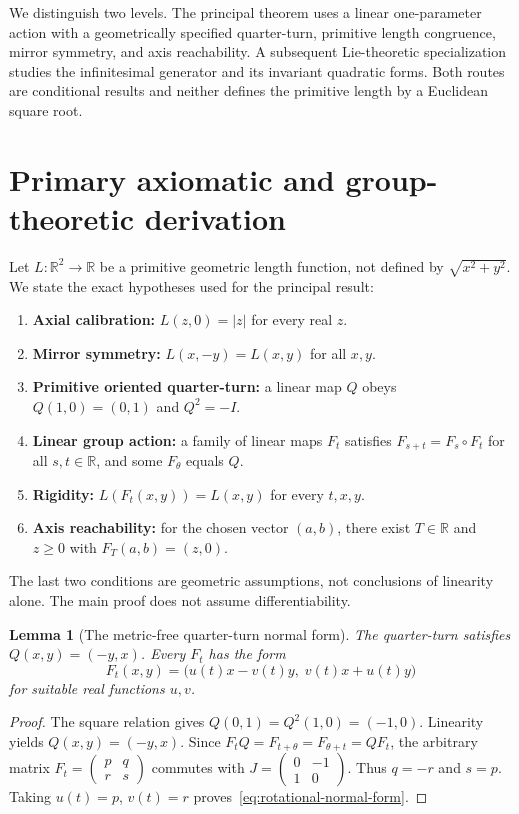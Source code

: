 \documentclass[11pt,a4paper]{article}
\newtheorem{lemma}{Lemma}[section]
\begin{document}
We distinguish two levels. The principal theorem uses a linear one-parameter action with a geometrically specified quarter-turn, primitive length congruence, mirror symmetry, and axis reachability. A subsequent Lie-theoretic specialization studies the infinitesimal generator and its invariant quadratic forms. Both routes are conditional results and neither defines the primitive length by a Euclidean square root.


\section{Primary axiomatic and group-theoretic derivation}
\label{sec:primary}
Let $L:\mathbb R^2\to\mathbb R$ be a primitive geometric length function,
not defined by $\sqrt{x^2+y^2}$. We state the exact hypotheses used
for the principal result:
\begin{enumerate}
\item \textbf{Axial calibration:} $L(z,0)=|z|$ for every real $z$.
\item \textbf{Mirror symmetry:} $L(x,-y)=L(x,y)$ for all $x,y$.
\item \textbf{Primitive oriented quarter-turn:} a linear map $Q$ obeys
$Q(1,0)=(0,1)$ and $Q^2=-I$.
\item \textbf{Linear group action:} a family of linear maps
$F_t$ satisfies $F_{s+t}=F_s\circ F_t$ for all $s,t\in\mathbb R$,
and some $F_\theta$ equals $Q$.
\item \textbf{Rigidity:} $L(F_t(x,y))=L(x,y)$ for every $t,x,y$.
\item \textbf{Axis reachability:} for the chosen vector $(a,b)$,
there exist $T\in\mathbb R$ and $z\geq0$ with
$F_T(a,b)=(z,0)$.
\end{enumerate}
The last two conditions are geometric assumptions, not conclusions
of linearity alone. The main proof does not assume differentiability.

\begin{lemma}[The metric-free quarter-turn normal form]
The quarter-turn satisfies $Q(x,y)=(-y,x)$.
Every $F_t$ has the form
\begin{equation}\label{eq:rotational-normal-form}
 F_t(x,y)=\bigl(u(t)x-v(t)y,\;v(t)x+u(t)y\bigr)
\end{equation}
for suitable real functions $u,v$.
\end{lemma}
\begin{proof}
The square relation gives $Q(0,1)=Q^2(1,0)=(-1,0)$.
Linearity yields $Q(x,y)=(-y,x)$. Since
$F_t Q=F_{t+\theta}=F_{\theta+t}=QF_t$,
the arbitrary matrix
$F_t=\begin{pmatrix}p&q\\r&s\end{pmatrix}$
commutes with
$J=\begin{pmatrix}0&-1\\1&0\end{pmatrix}$.
Thus $q=-r$ and $s=p$. Taking $u(t)=p$,
$v(t)=r$ proves~\eqref{eq:rotational-normal-form}.
\end{proof}
\end{document}
